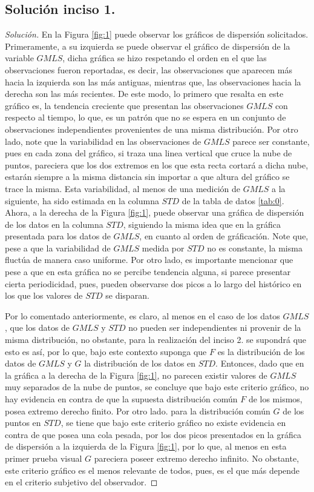 \documentclass[10.5pt,notitlepage]{article}
\newenvironment{solucion}
  {\begin{proof}[Solución]}
  {\end{proof}}
\theoremstyle{plain}
\begin{document}
\subsection{Solución inciso 1.}
\begin{solucion}
En la Figura \ref{fig:1} puede observar los gráficos de dispersión solicitados. Primeramente, a su izquierda se puede observar el gráfico de dispersión de la variable \(GMLS\), dicha gráfica se hizo respetando el orden en el que las observaciones fueron reportadas, es decir, las observaciones que aparecen más hacia la izquierda son las más antiguas, mientras que, las observaciones hacia la derecha son las más recientes. De este modo, lo primero que resalta en este gráfico es, la tendencia creciente que presentan las observaciones \(GMLS\) con respecto al tiempo, lo que, es un patrón que no se espera en un conjunto de observaciones independientes provenientes de una misma distribución. Por otro lado, note que la variabilidad en las observaciones de \(GMLS\) parece ser constante, pues en cada zona del gráfico, si traza una linea vertical que cruce la nube de puntos, pareciera que los dos extremos en los que esta recta cortará a dicha nube, estarán siempre a la misma distancia sin importar a que altura del gráfico se trace la misma. Esta variabilidad, al menos de una medición de \(GMLS\) a la siguiente, ha sido estimada en la columna \(STD\) de la tabla de datos \ref{tab:0}. Ahora, a la derecha de la Figura \ref{fig:1}, puede observar una gráfica de dispersión de los datos en la columna \(STD\), siguiendo la misma idea que en la gráfica presentada para los datos de \(GMLS\), en cuanto al orden de gráficación. Note que, pese a que la variabilidad de \(GMLS\) medida por \(STD\) no es constante, la misma fluctúa de manera caso uniforme. Por otro lado, es importante mencionar que pese a que en esta gráfica no se percibe tendencia alguna, si parece presentar cierta periodicidad, pues, pueden observarse dos picos a lo largo del histórico en los que los valores de \(STD\) se disparan. 

Por lo comentado anteriormente, es claro, al menos en el caso de los datos \(GMLS\), que los datos de \(GMLS\) y \(STD\) no pueden ser independientes ni provenir de la misma distribución, no obstante, para la realización del inciso 2. se supondrá que esto es así, por lo que, bajo este contexto suponga que \(F\) es la distribución de los datos de \(GMLS\) y \(G\) la distribución de los datos en \(STD\). Entonces, dado que en la gráfica a la derecha de la Figura \ref{fig:1}, no parecen existir valores de \(GMLS\) muy separados de la nube de puntos, se concluye que bajo este criterio gráfico, no hay evidencia en contra de que la supuesta distribución común \(F\) de los mismos, posea extremo derecho finito. Por otro lado. para la distribución común \(G\) de los puntos en \(STD\), se tiene que bajo este criterio gráfico no existe evidencia en contra de que posea una cola pesada, por los dos picos presentados en la gráfica de dispersión a la izquierda de la Figura \ref{fig:1}, por lo que, al menos en esta primer prueba visual \(G\) pareciera poseer extremo derecho infinito. No obstante, este criterio gráfico es el menos relevante de todos, pues, es el que más depende en el criterio subjetivo del observador.      
\end{solucion}
\end{document}
